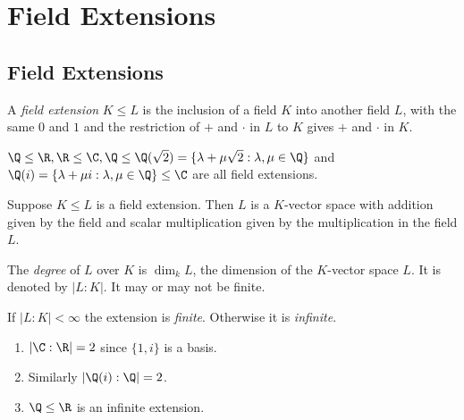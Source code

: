 \documentclass[a4paper]{article}
\begin{document}
\section{Field Extensions}

\subsection{Field Extensions}

\begin{definition}
  A \emph{field extension} \(K \leq L\) is the inclusion of a field \(K\) into another field \(L\), with the same \(0\) and \(1\) and the restriction of \(+\) and \(\cdot\) in \(L\) to \(K\) gives \(+\) and \(\cdot\) in \(K\).
\end{definition}

\begin{eg}
  \(\Q \leq \R, \R \leq \C, \Q \leq \Q(\sqrt 2) = \{\lambda + \mu \sqrt 2: \lambda, \mu \in \Q\}\) and \(\Q(i) = \{\lambda + \mu i: \lambda, \mu \in \Q\} \leq \C\) are all field extensions.
\end{eg}

Suppose \(K \leq L\) is a field extension. Then \(L\) is a \(K\)-vector space with addition given by the field and scalar multiplication given by the multiplication in the field \(L\).

\begin{definition}
  The \emph{degree} of \(L\) over \(K\) is \(\dim_kL\), the dimension of the \(K\)-vector space \(L\). It is denoted by \(|L:K|\). It may or may not be finite.
\end{definition}

\begin{definition}
  If \(|L:K| < \infty\) the extension is \emph{finite}. Otherwise it is \emph{infinite}.
\end{definition}

\begin{eg}\leavevmode
  \begin{enumerate}
  \item \(|\C:\R| = 2\) since \(\{1, i\}\) is a basis.
  \item Similarly \(|\Q(i):\Q| = 2\).
  \item \(\Q \leq \R\) is an infinite extension.
  \end{enumerate}
\end{eg}
\end{document}
